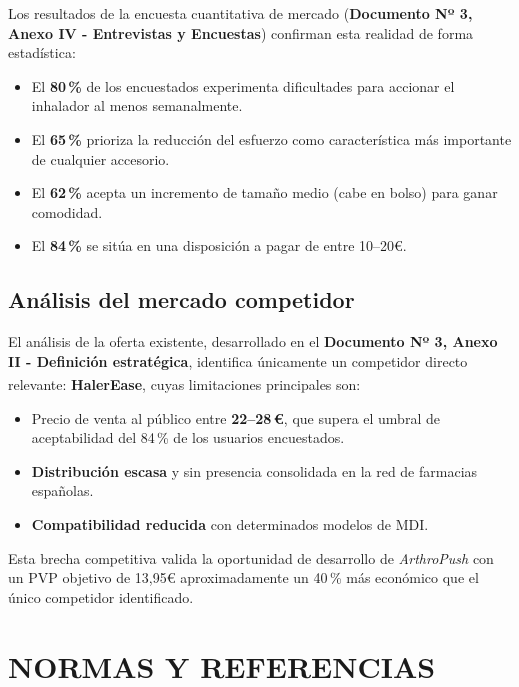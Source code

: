 \documentclass[11pt,a4paper]{article}
\begin{document}
Los resultados de la encuesta cuantitativa de mercado (\textbf{Documento Nº 3, Anexo IV - Entrevistas y Encuestas}) confirman esta realidad de forma estadística:

\begin{itemize}
    \item El \textbf{80\,\%} de los encuestados experimenta dificultades para accionar el inhalador al menos semanalmente.
    \item El \textbf{65\,\%} prioriza la reducción del esfuerzo como característica más importante de cualquier accesorio.
    \item El \textbf{62\,\%} acepta un incremento de tamaño medio (cabe en bolso) para ganar comodidad.
    \item El \textbf{84\,\%} se sitúa en una disposición a pagar de entre 10--20€.
\end{itemize}

\subsection{Análisis del mercado competidor}

El análisis de la oferta existente, desarrollado en el \textbf{Documento Nº 3, Anexo II - Definición estratégica}, identifica únicamente un competidor directo relevante: \textbf{HalerEase\textsuperscript{\textregistered}}, cuyas limitaciones principales son:

\begin{itemize}
    \item Precio de venta al público entre \textbf{22–28\,€}, que supera el umbral de aceptabilidad del 84\,\% de los usuarios encuestados.
    \item \textbf{Distribución escasa} y sin presencia consolidada en la red de farmacias españolas.
    \item \textbf{Compatibilidad reducida} con determinados modelos de MDI.
\end{itemize}

Esta brecha competitiva valida la oportunidad de desarrollo de \textit{ArthroPush} con un PVP objetivo de 13,95€ aproximadamente un 40\,\% más económico que el único competidor identificado.


\section{NORMAS Y REFERENCIAS}
\end{document}
